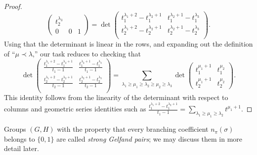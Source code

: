 \documentclass[reqno]{amsart} 
\begin{document}
\begin{proof}
\begin{equation*}
\begin{pmatrix}
      t_2^{\lambda_3} \\
      0 & 0 & 1      
    \end{pmatrix}
    =
    \det 
\begin{pmatrix}
      t_1^{\lambda_1 + 2} - t_1^{\lambda_2 + 1}
      & t_1^{\lambda_2 + 1} - t_1^{\lambda_3} \\
      t_2^{\lambda_1 + 2} -
      t_2^{\lambda_2 + 1} & t_2^{\lambda_2
        + 1} - t_2^{\lambda_3}      \\
    \end{pmatrix}
.
\end{equation*}
  Using that the determinant is linear in the rows, and expanding out the definition of ``$\mu \prec \lambda$,'' our task reduces to checking that
  \begin{equation*}
    \det 
    \begin{pmatrix}
      \frac{t_1^{\lambda_1 + 2} - t_1^{\lambda_2 + 1}}{t_1 - 1}
      & \frac{t_1^{\lambda_2 + 1} - t_1^{\lambda_3}}{t_1-1} \\
      \frac{t_2^{\lambda_1 + 2} -
      t_2^{\lambda_2 + 1}}{t_2-1} &
                                    \frac{t_2^{\lambda_2
                                    + 1} - t_2^{\lambda_3}}{t_2-1}      \\
    \end{pmatrix}
    =
    \sum_{\lambda_1 \geq \mu_1 \geq \lambda_2 \geq \mu_2 \geq \lambda_3}
    \det
    \begin{pmatrix}
      t_1^{\mu_1 + 1} & t_1^{\mu_2} \\
      t_2^{\mu_1 + 1} & t_2^{\mu_2}
    \end{pmatrix}
    .
  \end{equation*}
  This identity follows from the linearity of the determinant with respect to columns and geometric series identities such as $\frac{t_1^{\lambda_1 + 2} - t_1^{\lambda_2 + 1}}{t_1 - 1} = \sum_{\lambda_1 \geq \mu_1 \geq \lambda_2} t^{\mu_1 + 1}$.
\end{proof}

Groups $(G,H)$ with the property that every branching coefficient $n_\pi(\sigma)$ belongs to $\{0,1\}$ are called \emph{strong Gelfand pairs}; we may discuss them in more detail later.
\end{document}
